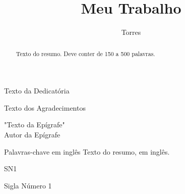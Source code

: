 \documentclass[tcc,capa,table]{textsi}
\title{Meu Trabalho}
\author{Torres}{Giovane de Oliveira}
\begin{document}
\newcommand{\coorientadora}{Coorientadora}		%


\maketitle 

\sloppy

\fichacatalografica
\folhadeaprovacao

\begin{dedicatoria}
	Texto da Dedicatória
\end{dedicatoria}

\begin{agradecimentos}
	Texto dos Agradecimentos
\end{agradecimentos}

\begin{epigrafe}
	"Texto da Epígrafe" \\
	Autor da Epígrafe
\end{epigrafe}

\begin{abstract}
	Texto do resumo. Deve conter de 150 a 500 palavras.
\end{abstract}

\begin{englishabstract}%
 	{Palavras-chave em inglês}
 	Texto do resumo, em inglês.
\end{englishabstract}

\listoffigures

\listoftables

\begin{listofabbrv}{SN1} %
	\item[SN1] Sigla Número 1
\end{listofabbrv}

\tableofcontents

\end{document}
